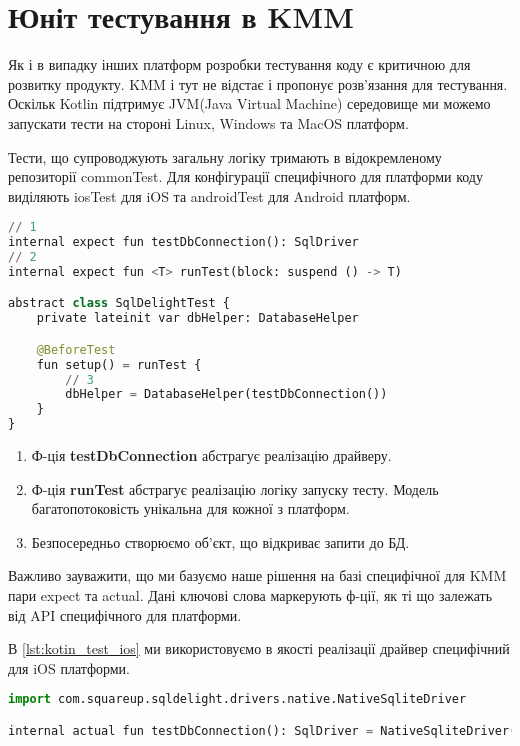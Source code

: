 \section{Юніт тестування в KMM}
\label{section.4.4}

Як і в випадку інших платформ розробки тестування коду є критичною для розвитку продукту.
KMM і тут не відстає і пропонує розв'язання для тестування.
Оскільк Kotlin підтримує JVM(Java Virtual Machine) середовище ми можемо запускати тести на стороні Linux, Windows та MacOS платформ.

Тести, що супроводжують загальну логіку тримають в відокремленому репозиторії commonTest.
Для конфігурації специфічного для платформи коду виділяють iosTest для iOS та androidTest для Android платформ.

\begin{lstlisting}[style=light, language=Python,label={lst:kotin_test_common},caption=Common Unit Test]
// 1
internal expect fun testDbConnection(): SqlDriver
// 2
internal expect fun <T> runTest(block: suspend () -> T)

abstract class SqlDelightTest {
    private lateinit var dbHelper: DatabaseHelper

    @BeforeTest
    fun setup() = runTest {
        // 3
        dbHelper = DatabaseHelper(testDbConnection())
    }
}
\end{lstlisting}

\begin{enumerate}
    \item Ф-ція \textbf{testDbConnection} абстрагує реалізацію драйверу.
    \item Ф-ція \textbf{runTest} абстрагує реалізацію логіку запуску тесту. Модель багатопотоковість унікальна для кожної з платформ.
    \item Безпосередньо створюємо об'єкт, що відкриває запити до БД.
\end{enumerate}

Важливо зауважити, що ми базуємо наше рішення на базі специфічної для KMM пари expect та actual.
Дані ключові слова маркерують ф-ції, як ті що залежать від API специфічного для платформи.

В \ref{lst:kotin_test_ios} ми використовуємо в якості реалізації драйвер специфічний для iOS платформи.

\begin{lstlisting}[style=light, language=Python,label={lst:kotin_test_ios},caption=iOS SQLDriver]
import com.squareup.sqldelight.drivers.native.NativeSqliteDriver

internal actual fun testDbConnection(): SqlDriver = NativeSqliteDriver(BAIDB.Schema, "baidb")
\end{lstlisting}

